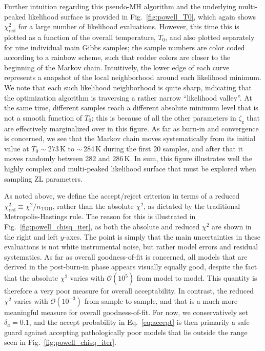 \documentclass[twocolumn]{aa}
\begin{document}
Further intuition regarding this pseudo-MH algorithm and the
underlying multi-peaked likelihood surface is provided in
Fig.~\ref{fig:powell_T0}, which again shows $\chi^2_{\mathrm{red}}$
for a large number of likelihood evaluations. However, this time this
is plotted as a function of the overall temperature, $T_0$, and also
plotted separately for nine individual main Gibbs samples; the sample
numbers are color coded according to a rainbow scheme, such that
redder colors are closer to the beginning of the Markov
chain. Intuitively, the lower edge of each curve represents a snapshot
of the local neighborhood around each likelihood minimum. We note that
each such likelihood neighborhood is quite sharp, indicating that the
optimization algorithm is traversing a rather narrow ``likelihood
valley''. At the same time, different samples reach a different
absolute minimum level that is not a smooth function of $T_0$; this is
because of all the other parameters in $\zeta_{\mathrm{z}}$ that are
effectively marginalized over in this figure. As far as burn-in and
convergence is concerned, we see that the Markov chain moves
systematically from its initial value at $T_0\sim273\,$K to
$\sim$\,284\,K during the first 20 samples, and after that it moves
randomly between 282 and 286\,K. In sum, this figure illustrates well
the highly complex and multi-peaked likelihood surface that must be
explored when sampling ZL parameters.

As noted above, we define the accept/reject criterion in terms of a
reduced $\chi^2_{\mathrm{red}}\equiv\chi^2/n_{\mathrm{TOD}}$, rather
than the absolute $\chi^2$, as dictated by the traditional
Metropolis-Hastings rule. The reason for this is illustrated in
Fig.~\ref{fig:powell_chisq_iter}, as both the absolute and reduced
$\chi^2$ are shown in the right and left $y$-axes. The point is simply
that the main uncertainties in these evaluations is not white
instrumental noise, but rather model errors and residual
systematics. As far as overall goodness-of-fit is concerned, all
models that are derived in the post-burn-in phase appears visually
equally good, despite the fact that the absolute $\chi^2$ varies with
$\mathcal{O}(10^5)$ from model to model. This quantity is therefore a
very poor measure for overall acceptability. In contrast, the reduced
$\chi^2$ varies with $\mathcal{O}(10^{-3})$ from sample to sample, and
that is a much more meaningful measure for overall
goodness-of-fit. For now, we conservatively set $\delta_a = 0.1$, and
the accept probability in Eq.~\eqref{eq:accept} is then primarily a
safe-guard against accepting pathologically poor models that lie
outside the range seen in Fig.~\ref{fig:powell_chisq_iter}. 
\end{document}

